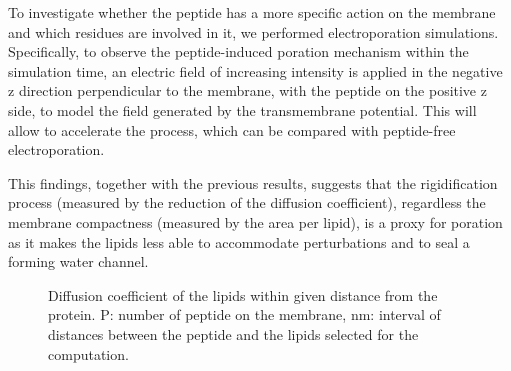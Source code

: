 To investigate whether the peptide has a more specific action on the membrane and which residues are involved in it, we performed electroporation simulations.
%
Specifically, to observe the peptide-induced poration mechanism within the simulation time, an electric field of increasing intensity is applied in the negative z direction perpendicular to the membrane, with the peptide on the positive z side, to model the field generated by the transmembrane potential.
%
This will allow to accelerate the process, which can be compared with peptide-free electroporation.

This findings, together with the previous results, suggests that the rigidification process (measured by the reduction of the diffusion coefficient), regardless the membrane compactness (measured by the area per lipid), is a proxy for poration as it makes the lipids less able to accommodate perturbations and to seal a forming water channel.

\begin{figure}[t]
\centering
\caption{Diffusion coefficient of the lipids within given distance from the protein. P: number of peptide on the membrane, nm: interval of distances between the peptide and the lipids selected for the computation. }
\label{fig:msd_increase}
\end{figure}







